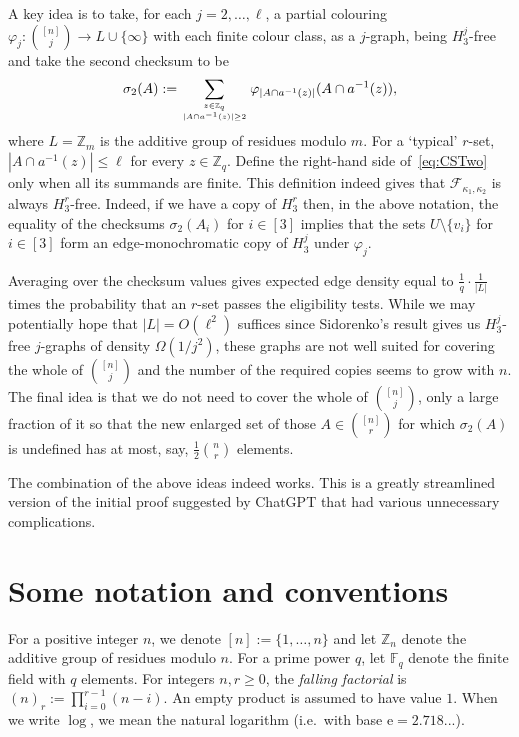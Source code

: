 \documentclass[12pt,a4paper]{article}
\numberwithin{equation}{section}
\theoremstyle{definition}
\theoremstyle{remark}
\newcommand{\Z}[1]{\mathbb Z_{#1}}
\newcommand{\me}{\mathrm{e}}
\newcommand{\CSTwo}{\sigma_2}
\newcommand{\F}[2]{\mathcal F_{#1,#2}}
\newcommand{\PP}{m}
\begin{document}
{A key idea is to take, for each $j=2,\ldots,\ell$, a partial colouring $\varphi_j:\binom{[n]}j\to L\cup\{\infty\}$ with each finite colour class, as a $j$-graph, being $H_3^j$-free and take the second checksum to be
\begin{equation}\label{eq:CSTwo}
\CSTwo(A):=\sum_{z\in\Z{q}\atop 
|A\cap a^{-1}(z)|\ge 2} \varphi_{|A\cap a^{-1}(z)|}(A\cap a^{-1}(z)),
\end{equation}
 where $L=\Z{\PP}$ is the additive group of residues modulo $\PP$. For a `typical' $r$-set, $|A\cap a^{-1}(z)|\le\ell$ for every $z\in\Z{q}$. Define the right-hand side of~\eqref{eq:CSTwo} only when all its summands are finite. This definition indeed gives that $\F{\kappa_1}{\kappa_2}$ is always $H_3^r$-free. Indeed, if we have a copy of $H_3^r$ then, 
 in the above notation,
 the equality of the checksums $\CSTwo(A_i)$ for $i\in [3]$ implies that the sets $U\setminus \{v_i\}$ for $i\in [3]$ form an edge-monochromatic copy of $H_3^j$ under $\varphi_j$.
 
 
Averaging over the checksum values gives expected edge density equal to $\frac1q\cdot\frac1{|L|}$ times the probability that an $r$-set passes the eligibility tests. While we may potentially hope that $|L|=O(\ell^2)$ suffices since Sidorenko's result gives us $H_3^j$-free $j$-graphs of density $\Omega(1/j^2)$, these graphs are not well suited for covering the whole of  $\binom{[n]}j$ and the number of the required copies seems to grow with $n$. The final idea is that we do not need to cover the whole of $\binom{[n]}j$, only a large fraction of it so that the new enlarged set of those $A\in\binom{[n]}r$ for which $\CSTwo(A)$ is undefined has at most, say, $\frac12\binom nr$ elements. 

The combination of the above ideas indeed works. This is a greatly streamlined version of the initial proof suggested by ChatGPT that had various unnecessary complications.
}


\section{Some notation and conventions}\label{sec:notation}

For a positive integer $n$, we denote $[n]:=\{1,\dots,n\}$ and let $\Z{n}$ denote the additive group of residues modulo $n$. For a prime power $q$, let $\mathbb F_q$ denote the finite field with $q$ elements.
For integers $n,r\ge 0$, the \emph{falling factorial} is $(n)_r:=\prod_{i=0}^{r-1}(n-i)$. An empty product is assumed to have value $1$.
When we write $\log$, we mean the natural logarithm (i.e.\ with base $\me=2.718...$).
\end{document}
